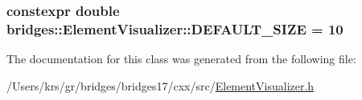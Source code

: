 \subsubsection[{D\+E\+F\+A\+U\+L\+T\+\_\+\+S\+I\+Z\+E}]{\setlength{\rightskip}{0pt plus 5cm}constexpr double bridges\+::\+Element\+Visualizer\+::\+D\+E\+F\+A\+U\+L\+T\+\_\+\+S\+I\+Z\+E = 10\hspace{0.3cm}{\ttfamily [static]}}\label{classbridges_1_1_element_visualizer_a81cc788d6149d5d582099cbc35e18c5a}


The documentation for this class was generated from the following file\+:\begin{DoxyCompactItemize}
\item 
/\+Users/krs/gr/bridges/bridges17/cxx/src/\hyperlink{_element_visualizer_8h}{Element\+Visualizer.\+h}\end{DoxyCompactItemize}
